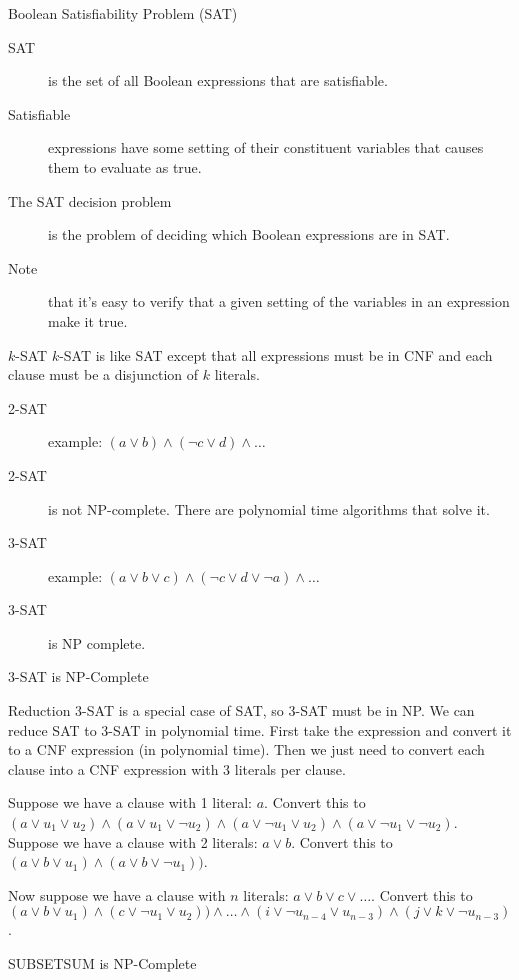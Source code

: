 \begin{frame}{Boolean Satisfiability Problem (SAT)}
  \begin{description}
    \item[SAT] is the set of all Boolean expressions that are satisfiable.
    \item[Satisfiable] expressions have some setting of their constituent variables that causes them to evaluate as true.
    \item[The SAT decision problem] is the problem of deciding which Boolean expressions are in SAT.
    \item[Note] that it's easy to verify that a given setting of the variables in an expression make it true.
  \end{description}
\end{frame}


\begin{frame}{$k$-SAT}
  $k$-SAT is like SAT except that all expressions must be in CNF and each clause must be a disjunction of $k$ literals.

  \vspace{2mm}

  \begin{description}
    \item[2-SAT] example: $(a \lor b) \land (\neg c \lor d) \land \ldots$
    \item[2-SAT] is not NP-complete. There are polynomial time algorithms that solve it.
    \item[3-SAT] example: $(a \lor b \lor c) \land (\neg c \lor d \lor \neg a) \land \ldots$
    \item[3-SAT] is NP complete.
  \end{description}
\end{frame}


\begin{frame}{3-SAT is NP-Complete}

  \begin{alertblock}{Reduction}
    3-SAT is a special case of SAT, so 3-SAT must be in NP.
    We can reduce SAT to 3-SAT in polynomial time.
    First take the expression and convert it to a CNF expression (in polynomial time).
    Then we just need to convert each clause into a CNF expression with 3 literals per clause.
    
    Suppose we have a clause with 1 literal: $a$.
    Convert this to $(a \lor u_1 \lor u_2) \land (a \lor u_1 \lor \neg u_2) \land (a \lor \neg u_1 \lor u_2) \land (a \lor \neg u_1 \lor \neg u_2)$.
    Suppose we have a clause with 2 literals: $a \lor b$.
    Convert this to $(a \lor b \lor u_1) \land (a \lor b \lor \neg u_1))$.
    
    Now suppose we have a clause with $n$ literals: $a \lor b \lor c \lor \ldots$.
    Convert this to $(a \lor b \lor u_1) \land (c \lor \neg u_1 \lor u_2)) \land \ldots \land (i \lor \neg u_{n-4} \lor u_{n-3}) \land (j \lor k \lor \neg u_{n-3})$.
  \end{alertblock}

\end{frame}


\begin{frame}{SUBSETSUM is NP-Complete}

\end{frame}